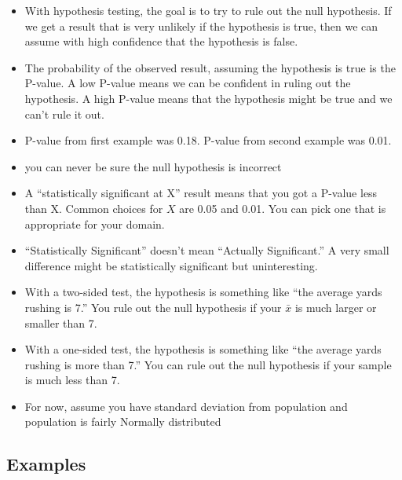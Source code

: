 \documentclass[letterpaper, landscape]{exam}
\begin{document}
  \begin{itemize}
    \item With hypothesis testing, the goal is to try to rule out the null
      hypothesis. If we get a result that is very unlikely if the hypothesis is
      true, then we can assume with high confidence that the hypothesis is
      false.

    \item The probability of the observed result, assuming the hypothesis is
      true is the P-value. A low P-value means we can be confident in ruling out
      the hypothesis. A high P-value means that the hypothesis might be true and
      we can't rule it out.

    \item P-value from first example was 0.18. P-value from second example was
      0.01.

    \item you can never be sure the null hypothesis is incorrect

    \item A ``statistically significant at X'' result means that you got a P-value
      less than X. Common choices for $X$ are 0.05 and 0.01. You can pick one
      that is appropriate for your domain.

    \item ``Statistically Significant'' doesn't mean ``Actually Significant.'' A
      very small difference might be statistically significant but
      uninteresting.

    \item With a two-sided test, the hypothesis is something like ``the average
      yards rushing is 7.'' You rule out the null hypothesis if your $\bar{x}$
      is much larger or smaller than 7.

    \item With a one-sided test, the hypothesis is something like ``the average
      yards rushing is more than 7.'' You can rule out the null hypothesis if
      your sample is much less than 7.

    \item For now, assume you have standard deviation from population and
      population is fairly Normally distributed

  \end{itemize}

  \subsection{Examples}
\end{document}
